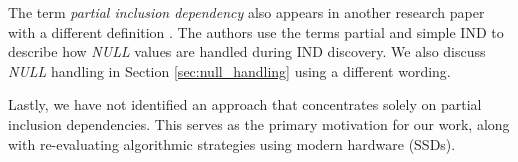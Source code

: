 The term \textit{partial inclusion dependency} also appears in another research paper with a different definition \cite{kohler2015inclusion}. The authors use the terms partial and simple IND to describe how \textit{NULL} values are handled during IND discovery. We also discuss \textit{NULL} handling in Section \ref{sec:null_handling} using a different wording.

Lastly, we have not identified an approach that concentrates solely on partial inclusion dependencies. This serves as the primary motivation for our work, along with re-evaluating algorithmic strategies using modern hardware (SSDs).

